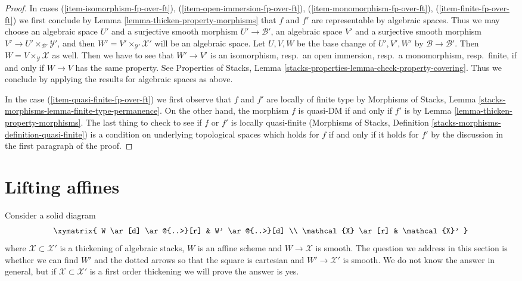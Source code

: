 \begin{proof}
\medskip\noindent
In cases (\ref{item-isomorphism-fp-over-ft}),
(\ref{item-open-immersion-fp-over-ft}),
(\ref{item-monomorphism-fp-over-ft}),
(\ref{item-finite-fp-over-ft})
we first conclude by Lemma \ref{lemma-thicken-property-morphisms}
that $f$ and $f'$ are representable by algebraic spaces. Thus we may choose
an algebraic space $U'$ and a surjective smooth morphism
$U' \to \mathcal{B}'$,
an algebraic space $V'$ and a surjective smooth morphism
$V' \to U' \times_{\mathcal{B}'} \mathcal{Y}'$, and then
$W' = V' \times_{\mathcal{Y}'} \mathcal{X}'$ will be an algebraic space.
Let $U, V, W$ be the base change of
$U', V', W'$ by $\mathcal{B} \to \mathcal{B}'$.
Then $W = V \times_\mathcal{Y} \mathcal{X}$ as well.
Then we have to see that $W' \to V'$ is an
isomorphism, resp.\ an open immersion, resp.\ a monomorphism,
resp.\ finite, if and only if $W \to V$ has the same property.
See Properties of Stacks, Lemma
\ref{stacks-properties-lemma-check-property-covering}.
Thus we conclude by applying the results
for algebraic spaces as above.

\medskip\noindent
In the case (\ref{item-quasi-finite-fp-over-ft}) we first
observe that $f$ and $f'$ are locally of finite type by
Morphisms of Stacks, Lemma \ref{stacks-morphisms-lemma-finite-type-permanence}.
On the other hand, the morphism $f$ is quasi-DM if and only if
$f'$ is by
Lemma \ref{lemma-thicken-property-morphisms}.
The last thing to check to see if $f$ or $f'$ is locally quasi-finite
(Morphisms of Stacks, Definition
\ref{stacks-morphisms-definition-quasi-finite})
is a condition on underlying topological spaces
which holds for $f$ if and only if it holds for $f'$ by
the discussion in the first paragraph of the proof.
\end{proof}









\section{Lifting affines}
\label{section-lifting-affines}

\noindent
Consider a solid diagram
$$
\xymatrix{
W \ar[d] \ar@{..>}[r] & W' \ar@{..>}[d] \\
\mathcal{X} \ar[r] & \mathcal{X}'
}
$$
where $\mathcal{X} \subset \mathcal{X}'$ is a thickening of algebraic stacks,
$W$ is an affine scheme and $W \to \mathcal{X}$ is smooth. The question
we address in this section is whether we can find $W'$ and the dotted
arrows so that the square is cartesian and $W' \to \mathcal{X}'$ is smooth.
We do not know the answer in general, but if $\mathcal{X} \subset \mathcal{X}'$
is a first order thickening we will prove the answer is yes.

